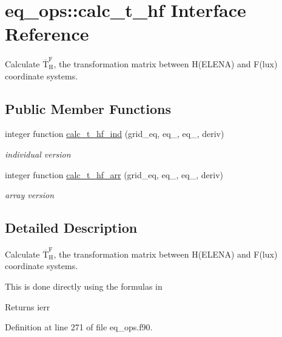 \hypertarget{interfaceeq__ops_1_1calc__t__hf}{}\section{eq\+\_\+ops\+:\+:calc\+\_\+t\+\_\+hf Interface Reference}
\label{interfaceeq__ops_1_1calc__t__hf}


Calculate $\overline{\text{T}}_\text{H}^\text{F}$, the transformation matrix between H(\+E\+L\+E\+N\+A) and F(lux) coordinate systems.  


\subsection*{Public Member Functions}
\begin{DoxyCompactItemize}
\item 
integer function \hyperlink{interfaceeq__ops_1_1calc__t__hf_a3194d70dace75dbc99d2e297536325e1}{calc\+\_\+t\+\_\+hf\+\_\+ind} (grid\+\_\+eq, eq\+\_, eq\+\_, deriv)
\begin{DoxyCompactList}\small\item\em individual version \end{DoxyCompactList}\item 
integer function \hyperlink{interfaceeq__ops_1_1calc__t__hf_a603859a698b8288ea62ee6a77f9fc2ca}{calc\+\_\+t\+\_\+hf\+\_\+arr} (grid\+\_\+eq, eq\+\_, eq\+\_, deriv)
\begin{DoxyCompactList}\small\item\em array version \end{DoxyCompactList}\end{DoxyCompactItemize}


\subsection{Detailed Description}
Calculate $\overline{\text{T}}_\text{H}^\text{F}$, the transformation matrix between H(\+E\+L\+E\+N\+A) and F(lux) coordinate systems. 

This is done directly using the formula\textquotesingle{}s in \cite{Weyens3D}

\begin{DoxyReturn}{Returns}
ierr 
\end{DoxyReturn}


Definition at line 271 of file eq\+\_\+ops.\+f90.



